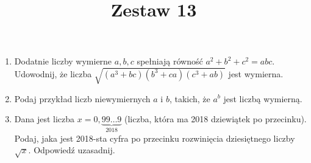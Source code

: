 \documentclass[10pt]{article}
\title{Zestaw 13 }
\author{}
\date{}
\begin{document}
\maketitle
\begin{enumerate}
  \item Dodatnie liczby wymierne \(a, b, c\) spełniają równość \(a^{2}+b^{2}+c^{2}=a b c\). Udowodnij, że liczba \(\sqrt{\left(a^{3}+b c\right)\left(b^{3}+c a\right)\left(c^{3}+a b\right)}\) jest wymierna.
  \item Podaj przykład liczb niewymiernych \(a\) i \(b\), takich, że \(a^{b}\) jest liczbą wymierną.
  \item Dana jest liczba \(x=0, \underbrace{99 \ldots 9}_{2018}\) (liczba, która ma 2018 dziewiątek po przecinku). Podaj, jaka jest 2018-sta cyfra po przecinku rozwinięcia dziesiętnego liczby \(\sqrt{x}\). Odpowiedź uzasadnij.
\end{enumerate}
\end{document}
